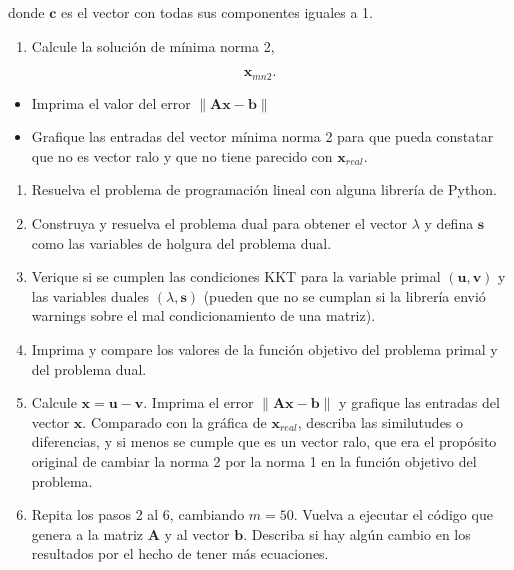 \documentclass[11pt]{article}
\providecommand{\tightlist}{%
      \setlength{\itemsep}{0pt}\setlength{\parskip}{0pt}}
\begin{document}
donde \(\mathbf{c}\) es el vector con todas sus componentes iguales a 1.

\begin{enumerate}
\def\labelenumi{\arabic{enumi}.}
\tightlist
\item
  Calcule la solución de mínima norma 2,
\end{enumerate}

\[ \mathbf{x}_{mn2}. \]

\begin{itemize}
\tightlist
\item
  Imprima el valor del error \(\|\mathbf{A} \mathbf{x}-\mathbf{b}\|\)
\item
  Grafique las entradas del vector mínima norma 2 para que pueda
  constatar que no es vector ralo y que no tiene parecido con
  \(\mathbf{x}_{real}\).
\end{itemize}

\begin{enumerate}
\def\labelenumi{\arabic{enumi}.}
\setcounter{enumi}{1}
\tightlist
\item
  Resuelva el problema de programación lineal con alguna librería de
  Python.
\item
  Construya y resuelva el problema dual para obtener el vector
  \(\lambda\) y defina \(\mathbf{s}\) como las variables de holgura del
  problema dual.
\item
  Verique si se cumplen las condiciones KKT para la variable primal
  \((\mathbf{u}, \mathbf{v})\) y las variables duales
  \((\lambda, \mathbf{s})\) (pueden que no se cumplan si la librería
  envió warnings sobre el mal condicionamiento de una matriz).
\item
  Imprima y compare los valores de la función objetivo del problema
  primal y del problema dual.
\item
  Calcule \(\mathbf{x} = \mathbf{u} - \mathbf{v}\). Imprima el error
  \(\|\mathbf{A} \mathbf{x}-\mathbf{b}\|\) y grafique las entradas del
  vector \(\mathbf{x}\). Comparado con la gráfica de
  \(\mathbf{x}_{real}\), describa las similutudes o diferencias, y si
  menos se cumple que es un vector ralo, que era el propósito original
  de cambiar la norma 2 por la norma 1 en la función objetivo del
  problema.
\item
  Repita los pasos 2 al 6, cambiando \(m=50\). Vuelva a ejecutar el
  código que genera a la matriz \(\mathbf{A}\) y al vector
  \(\mathbf{b}\). Describa si hay algún cambio en los resultados por el
  hecho de tener más ecuaciones.
\end{enumerate}
\end{document}
